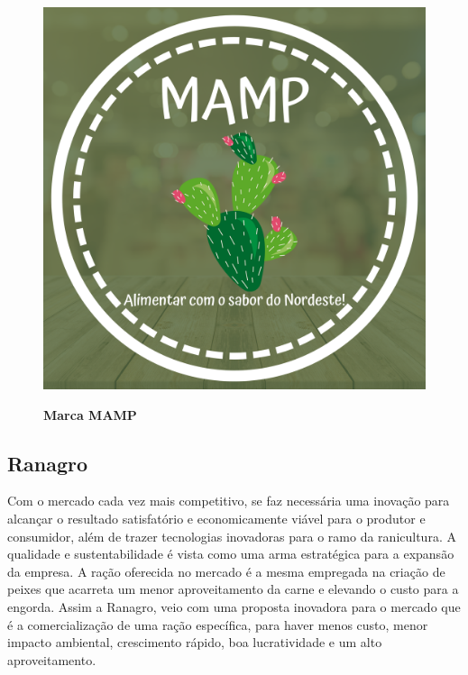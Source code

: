 \begin{figure}[H]
\centering
\caption{\textbf{Marca MAMP}}
\includegraphics[scale=0.1]{Imagens/mamp.png}
\label{figura_22}
\end{figure}


\subsection{Ranagro}

Com o mercado cada vez mais competitivo, se faz necessária uma inovação para alcançar o resultado satisfatório e economicamente viável para o produtor e consumidor, além de trazer tecnologias inovadoras para o ramo da ranicultura. A qualidade e sustentabilidade é vista como uma arma estratégica para a expansão da empresa. A ração oferecida no mercado é a mesma empregada na criação de peixes que acarreta um menor aproveitamento da carne e elevando o custo para a engorda. Assim a Ranagro, veio com uma proposta inovadora para o mercado que é a comercialização de uma ração específica, para haver menos custo, menor impacto ambiental, crescimento rápido, boa lucratividade e um alto aproveitamento. 




